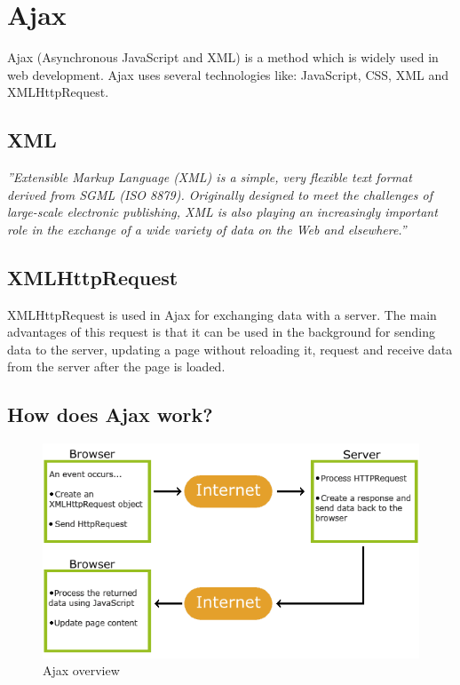 \section {Ajax}
Ajax (Asynchronous JavaScript and XML) is a method which is widely used in web development. Ajax uses several technologies like: JavaScript, CSS, XML and XMLHttpRequest.\cite{ajax}
\\
\subsection{XML}
\textit{''Extensible Markup Language (XML) is a simple, very flexible text format derived from SGML (ISO 8879). Originally designed to meet the challenges of large-scale electronic publishing, XML is also playing an increasingly important role in the exchange of a wide variety of data on the Web and elsewhere.''}\cite{xml}
\\
\subsection{XMLHttpRequest}
XMLHttpRequest is used in Ajax for exchanging data with a server. The main advantages of this request is that it can be used in the background for sending data to the server, updating a page without reloading it, request and receive data from the server after the page is loaded.\cite{xmlHttp} 
\newpage
\subsection{How does Ajax work?}
\begin{figure}[htbp]
\centering
\includegraphics[width=\textwidth,height=\textheight,keepaspectratio]{graphics/ajaxwork.png}
\caption{Ajax overview\cite{ajax}}
\end{figure}

